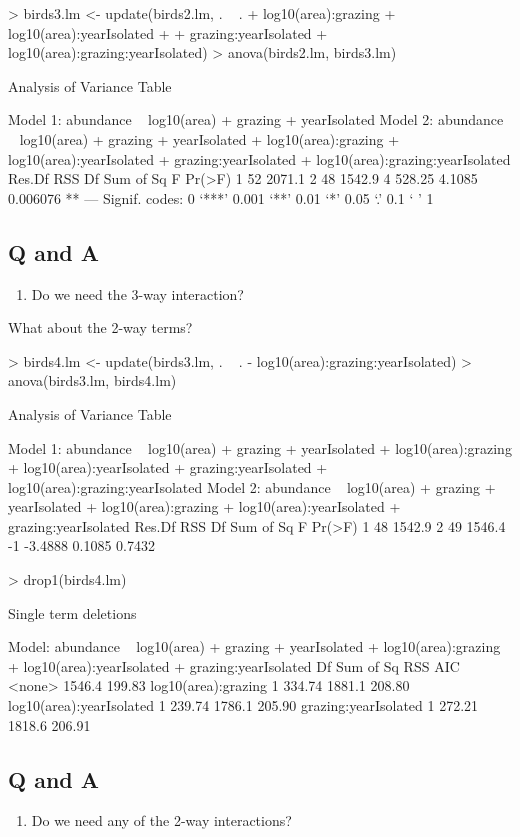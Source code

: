 \documentclass[letterpaper,10pt]{article}
\begin{document}
\begin{Schunk}
\begin{Sinput}
> birds3.lm <- update(birds2.lm, . ~ . + log10(area):grazing + log10(area):yearIsolated +
+                     grazing:yearIsolated + log10(area):grazing:yearIsolated)
> anova(birds2.lm, birds3.lm)
\end{Sinput}
\begin{Soutput}
Analysis of Variance Table

Model 1: abundance ~ log10(area) + grazing + yearIsolated
Model 2: abundance ~ log10(area) + grazing + yearIsolated + log10(area):grazing + 
    log10(area):yearIsolated + grazing:yearIsolated + log10(area):grazing:yearIsolated
  Res.Df    RSS Df Sum of Sq      F   Pr(>F)   
1     52 2071.1                                
2     48 1542.9  4    528.25 4.1085 0.006076 **
---
Signif. codes:  0 ‘***’ 0.001 ‘**’ 0.01 ‘*’ 0.05 ‘.’ 0.1 ‘ ’ 1
\end{Soutput}
\end{Schunk}

\subsection*{Q and A}
\begin{enumerate}
\item Do we need the 3-way interaction?
\end{enumerate}

What about the 2-way terms?

\begin{Schunk}
\begin{Sinput}
> birds4.lm <- update(birds3.lm, . ~ . - log10(area):grazing:yearIsolated)
> anova(birds3.lm, birds4.lm)
\end{Sinput}
\begin{Soutput}
Analysis of Variance Table

Model 1: abundance ~ log10(area) + grazing + yearIsolated + log10(area):grazing + 
    log10(area):yearIsolated + grazing:yearIsolated + log10(area):grazing:yearIsolated
Model 2: abundance ~ log10(area) + grazing + yearIsolated + log10(area):grazing + 
    log10(area):yearIsolated + grazing:yearIsolated
  Res.Df    RSS Df Sum of Sq      F Pr(>F)
1     48 1542.9                           
2     49 1546.4 -1   -3.4888 0.1085 0.7432
\end{Soutput}
\begin{Sinput}
> drop1(birds4.lm)
\end{Sinput}
\begin{Soutput}
Single term deletions

Model:
abundance ~ log10(area) + grazing + yearIsolated + log10(area):grazing + 
    log10(area):yearIsolated + grazing:yearIsolated
                         Df Sum of Sq    RSS    AIC
<none>                                1546.4 199.83
log10(area):grazing       1    334.74 1881.1 208.80
log10(area):yearIsolated  1    239.74 1786.1 205.90
grazing:yearIsolated      1    272.21 1818.6 206.91
\end{Soutput}
\end{Schunk}

\subsection*{Q and A}
\begin{enumerate}
\item Do we need any of the 2-way interactions?
\end{enumerate}
\end{document}
